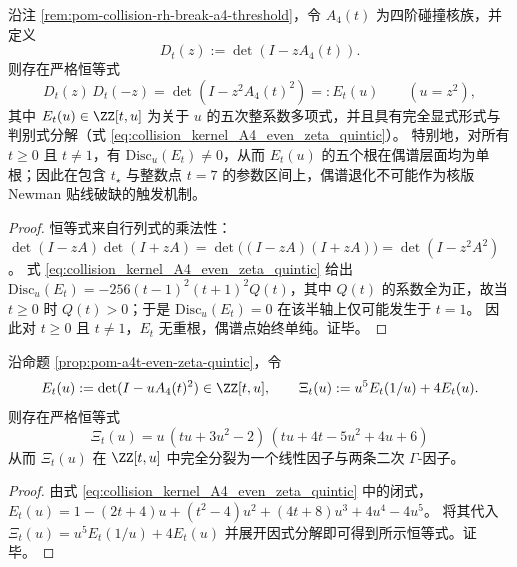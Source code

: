 
\begin{proposition}[四阶核族的偶谱五次闭式与偶谱单纯性]\label{prop:pom-a4t-even-zeta-quintic}
沿注 \ref{rem:pom-collision-rh-break-a4-threshold}，令 \(A_4(t)\) 为四阶碰撞核族，并定义
\[
D_t(z):=\det(I-zA_4(t)).
\]
则存在严格恒等式
\[
D_t(z)\,D_t(-z)=\det(I-z^2A_4(t)^2)=:E_t(u)\qquad(u=z^2),
\]
其中 \(E_t(u)\in\ZZ[t,u]\) 为关于 \(u\) 的五次整系数多项式，并且具有完全显式形式与判别式分解（式 \eqref{eq:collision_kernel_A4_even_zeta_quintic}）。
特别地，对所有 \(t\ge 0\) 且 \(t\neq 1\)，有 \(\mathrm{Disc}_u(E_t)\neq 0\)，从而 \(E_t(u)\) 的五个根在偶谱层面均为单根；因此在包含 \(t_\star\) 与整数点 \(t=7\) 的参数区间上，偶谱退化不可能作为核版 Newman 贴线破缺的触发机制。
\end{proposition}
\begin{proof}
恒等式来自行列式的乘法性：
\(
\det(I-zA)\det(I+zA)=\det\bigl((I-zA)(I+zA)\bigr)=\det(I-z^2A^2)
\)。
式 \eqref{eq:collision_kernel_A4_even_zeta_quintic} 给出 \(\mathrm{Disc}_u(E_t)=-256(t-1)^2(t+1)^2Q(t)\)，其中 \(Q(t)\) 的系数全为正，故当 \(t\ge 0\) 时 \(Q(t)>0\)；于是 \(\mathrm{Disc}_u(E_t)=0\) 在该半轴上仅可能发生于 \(t=1\)。
因此对 \(t\ge 0\) 且 \(t\neq 1\)，\(E_t\) 无重根，偶谱点始终单纯。证毕。
\end{proof}



\begin{proposition}\label{prop:pom-a4t-even-spectrum-completion-gamma-factorization}
沿命题 \ref{prop:pom-a4t-even-zeta-quintic}，令
\[
E_t(u):=\det(I-uA_4(t)^2)\in\ZZ[t,u],
\qquad
\Xi_t(u):=u^5E_t(1/u)+4E_t(u).
\]
则存在严格恒等式
\[
\boxed{\;
\Xi_t(u)
=
u\,(tu+3u^2-2)\,(tu+4t-5u^2+4u+6)\;}
\]
从而 \(\Xi_t(u)\) 在 \(\ZZ[t,u]\) 中完全分裂为一个线性因子与两条二次 \(\Gamma\)-因子。
\end{proposition}
\begin{proof}
由式 \eqref{eq:collision_kernel_A4_even_zeta_quintic} 中的闭式，
\(E_t(u)=1-(2t+4)u+(t^2-4)u^2+(4t+8)u^3+4u^4-4u^5\)。
将其代入 \(\Xi_t(u)=u^5E_t(1/u)+4E_t(u)\) 并展开因式分解即可得到所示恒等式。证毕。
\end{proof}

